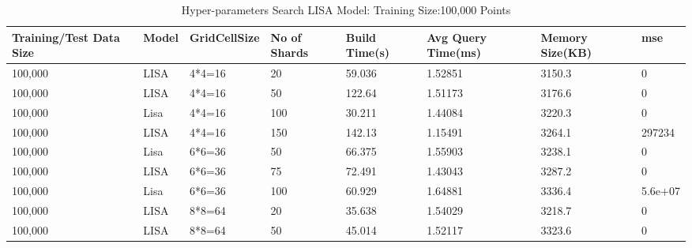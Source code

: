 \begin{table}
	\centering
	\begin{tabular}{||p{}<{\centering}|p{}<{\centering}|p{}<{\centering}| p{}<{\centering}|p{}<{\centering}|p{}<{\centering}|p{}<{\centering}|p{}<{\centering}||}
		\hline
		Training/Test Data Size& Model & GridCellSize & No of Shards & Build Time(s) & Avg Query Time(ms) & Memory Size(KB)&mse\\ [0.5ex] 
		\hline
		\hline
		100,000& LISA& 4*4=16 & 20& 59.036&1.52851 & 3150.3&0\\
		\hline
		100,000& LISA& 4*4=16 & 50& 122.64& 1.51173 & 3176.6&0\\
		\hline
		100,000& Lisa& 4*4=16 & 100& 30.211& 1.44084 & 3220.3&0\\
		\hline
		100,000& LISA& 4*4=16 & 150& 142.13&1.15491 & 3264.1&297234\\
		\hline
		100,000& Lisa& 6*6=36 & 50& 66.375& 1.55903 & 3238.1&0\\
		\hline
		100,000& LISA& 6*6=36 & 75& 72.491& 1.43043 & 3287.2&0\\
		\hline
		100,000& Lisa& 6*6=36 & 100& 60.929& 1.64881 & 3336.4&5.6e+07\\
		\hline
		100,000& LISA& 8*8=64 & 20& 35.638& 1.54029 & 3218.7&0\\
		\hline
		100,000& LISA& 8*8=64 & 50& 45.014& 1.52117 & 3323.6&0\\
		\hline
		\hline
	\end{tabular}
    \caption{Hyper-parameters Search LISA Model: Training Size:100,000 Points}
	\label{small_lognormal_lisa_100000}
\end{table}

